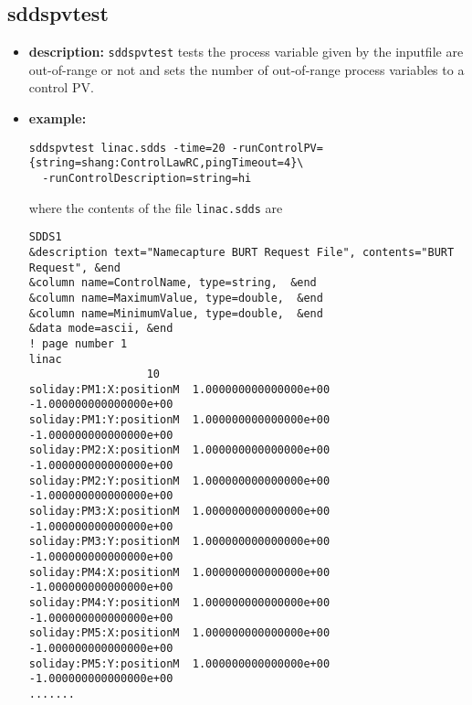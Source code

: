 %
%
\begin{latexonly}
\newpage
\end{latexonly}

%
%
\subsection{sddspvtest}
\label{sddspvtest}

\begin{itemize}
\item {\bf description:}
%
%
\verb+sddspvtest+ tests the process variable given by the inputfile are out-of-range
or not and sets the number of out-of-range process variables to a control PV.

\item {\bf example:} 
%
% 
%
\begin{verbatim}
sddspvtest linac.sdds -time=20 -runControlPV={string=shang:ControlLawRC,pingTimeout=4}\
  -runControlDescription=string=hi
\end{verbatim}
where the contents of the file \verb+linac.sdds+ are
\begin{verbatim}
SDDS1
&description text="Namecapture BURT Request File", contents="BURT Request", &end
&column name=ControlName, type=string,  &end
&column name=MaximumValue, type=double,  &end
&column name=MinimumValue, type=double,  &end
&data mode=ascii, &end
! page number 1
linac
                  10
soliday:PM1:X:positionM  1.000000000000000e+00 -1.000000000000000e+00 
soliday:PM1:Y:positionM  1.000000000000000e+00 -1.000000000000000e+00 
soliday:PM2:X:positionM  1.000000000000000e+00 -1.000000000000000e+00 
soliday:PM2:Y:positionM  1.000000000000000e+00 -1.000000000000000e+00 
soliday:PM3:X:positionM  1.000000000000000e+00 -1.000000000000000e+00 
soliday:PM3:Y:positionM  1.000000000000000e+00 -1.000000000000000e+00 
soliday:PM4:X:positionM  1.000000000000000e+00 -1.000000000000000e+00 
soliday:PM4:Y:positionM  1.000000000000000e+00 -1.000000000000000e+00 
soliday:PM5:X:positionM  1.000000000000000e+00 -1.000000000000000e+00 
soliday:PM5:Y:positionM  1.000000000000000e+00 -1.000000000000000e+00 
.......

\end{verbatim}


\end{itemize}

